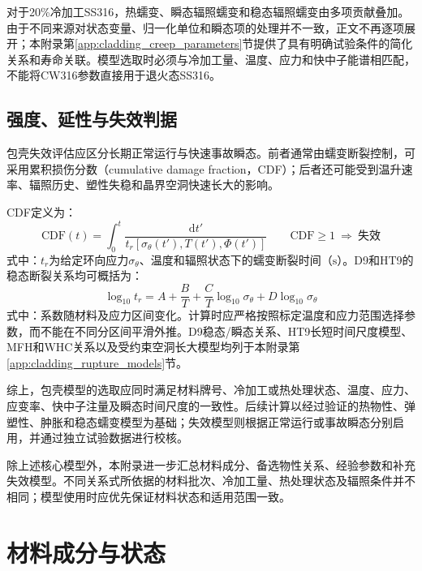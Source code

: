 对于20\%冷加工SS316，热蠕变、瞬态辐照蠕变和稳态辐照蠕变由多项贡献叠加。由于不同来源对状态变量、归一化单位和瞬态项的处理并不一致，正文不再逐项展开；本附录第\ref{app:cladding_creep_parameters}节提供了具有明确试验条件的简化关系和寿命关联。模型选取时必须与冷加工量、温度、应力和快中子能谱相匹配，不能将CW316参数直接用于退火态SS316。

\subsection{强度、延性与失效判据}
\label{sec:cladding_failure_models}

包壳失效评估应区分长期正常运行与快速事故瞬态。前者通常由蠕变断裂控制，可采用累积损伤分数（cumulative damage fraction，CDF）；后者还可能受到温升速率、辐照历史、塑性失稳和晶界空洞快速长大的影响\cite{FanningSAS4ASASSYS1Safety2017,KARAHAN2010283}。

CDF定义为：
\begin{equation}
	\mathrm{CDF}(t)
	=\int_0^t
	\frac{\mathrm dt'}
	{t_r[\sigma_\theta(t'),T(t'),\varPhi(t')]}
	\qquad
	\mathrm{CDF}\geq1\ \Longrightarrow\ \text{失效}
	\label{eq:clad_cumulative_damage_fraction}
\end{equation}
\noindent 式中：$t_r$为给定环向应力$\sigma_\theta$、温度和辐照状态下的蠕变断裂时间（$\mathrm{s}$）。D9和HT9的稳态断裂关系均可概括为：
\begin{equation}
	\log_{10}t_r
	=A+\frac{B}{T}
	+\frac{C}{T}\log_{10}\sigma_\theta
	+D\log_{10}\sigma_\theta
	\label{eq:clad_generic_rupture_time}
\end{equation}
\noindent 式中：系数随材料及应力区间变化。计算时应严格按照标定温度和应力范围选择参数，而不能在不同分区间平滑外推。D9稳态/瞬态关系、HT9长短时间尺度模型、MFH和WHC关系以及受约束空洞长大模型均列于本附录第\ref{app:cladding_rupture_models}节。

综上，包壳模型的选取应同时满足材料牌号、冷加工或热处理状态、温度、应力、应变率、快中子注量及瞬态时间尺度的一致性。后续计算以经过验证的热物性、弹塑性、肿胀和稳态蠕变模型为基础；失效模型则根据正常运行或事故瞬态分别启用，并通过独立试验数据进行校核。

除上述核心模型外，本附录进一步汇总材料成分、备选物性关系、经验参数和补充失效模型。不同关系式所依据的材料批次、冷加工量、热处理状态及辐照条件并不相同；模型使用时应优先保证材料状态和适用范围一致。

\section{材料成分与状态}
\label{app:cladding_material_compositions}

